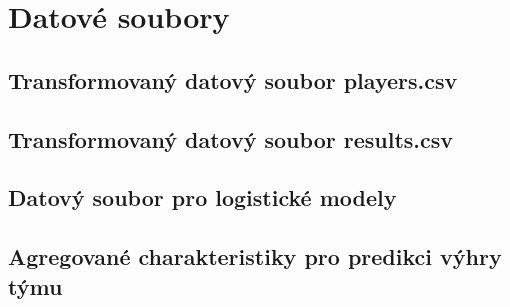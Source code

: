 \chapter{Datové soubory}
\section{Transformovaný datový soubor players.csv}


\section{Transformovaný datový soubor results.csv}


\section{Datový soubor pro logistické modely}


\section{Agregované charakteristiky pro predikci výhry týmu}
